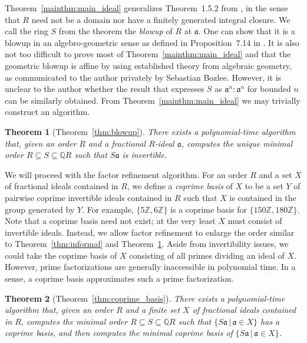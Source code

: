 \documentclass{amsart}
\theoremstyle{plain}
\newtheorem{theorem}{Theorem}[section]
\theoremstyle{definition}
\newcommand{\Z}{\ensuremath{\mathbb{Z}}}
\newcommand{\Q}{\ensuremath{\mathbb{Q}}}
\begin{document}
Theorem~\ref{mainthm:main_ideal} generalizes Theorem~1.5.2 from \cite{Dade-Zassenhaus}, in the sense that \(R\) need not be a domain nor have a finitely generated integral closure.
We call the ring \(S\) from the theorem the \emph{blowup} of \(R\) at \(\mathfrak{a}\). 
One can show that it is a blowup in an algebro-geometric sense as defined in Proposition~7.14 in \cite{Hartshorne}. 
It is also not too difficult to prove most of Theorem~\ref{mainthm:main_ideal} and that the geometric blowup is affine by using established theory from algebraic geometry, as communicated to the author privately by Sebastian Bozlee.
However, it is unclear to the author whether the result that expresses \(S\) as \(\mathfrak{a}^{n}:\mathfrak{a}^{n}\) for bounded \(n\) can be similarly obtained.
From Theorem~\ref{mainthm:main_ideal} we may trivially construct an algorithm.

\begin{theorem}[Theorem~\ref{thm:blowup}]\label{mainthm:blowup}
There exists a polynomial-time algorithm that, given an order \(R\) and a fractional \(R\)-ideal \(\mathfrak{a}\), computes the unique minimal order \(R\subseteq S\subseteq \Q R\) such that \(S\mathfrak{a}\) is invertible.
\end{theorem}

We will proceed with the factor refinement algorithm.
For an order \(R\) and a set \(X\) of fractional ideals contained in \(R\), we define a \emph{coprime basis} of \(X\) to be a set \(Y\) of pairwise coprime invertible ideals contained in \(R\) such that \(X\) is contained in the group generated by \(Y\). 
For example, $\{5\Z, 6\Z\}$ is a coprime basis for $\{150\Z,180\Z\}$.
Note that a coprime basis need not exist; at the very least \(X\) must consist of invertible ideals. 
Instead, we allow factor refinement to enlarge the order similar to Theorem~\ref{thm:informal} and Theorem~\ref{mainthm:blowup}.
Aside from invertibility issues, we could take the coprime basis of $X$ consisting of all primes dividing an ideal of \(X\).
However, prime factorizations are generally inaccessible in polynomial time.
In a sense, a coprime basis approximates such a prime factorization. 

\begin{theorem}[Theorem~\ref{thm:coprime_basis}]
There exists a polynomial-time algorithm that, given an order \(R\) and a finite set \(X\) of fractional ideals contained in \(R\), computes the minimal order \(R\subseteq S\subseteq \Q R\) such that \(\{S\mathfrak{a} \,|\, \mathfrak{a}\in X \}\) has a coprime basis, and then computes the minimal coprime basis of \(\{S\mathfrak{a} \,|\, \mathfrak{a}\in X \}\).
\end{theorem}
\end{document}
